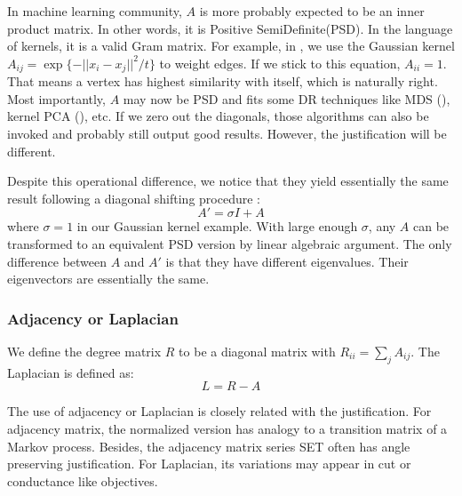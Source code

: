 In machine learning community, $A$ is more probably expected to be
an inner product matrix. In other words, it is Positive SemiDefinite(PSD). 
In the language of kernels, it is a valid Gram matrix. For example, 
in \rsec{\ref{sec:metric_hdd}}, we use the Gaussian kernel
$A_{ij} = \exp\{-||x_i-x_j||^2/t\}$ to weight edges. If we stick to 
this equation, $A_{ii} = 1$. That means a vertex has highest similarity 
with itself, which is naturally right. Most importantly, 
$A$ may now be PSD and fits some DR techniques like MDS
(\rsec{\ref{sec:mds}}), kernel PCA (\rsec{\ref{sec:kpca}}), etc. 
If we zero out the diagonals, those algorithms can also be invoked 
and probably still output good results. However, the justification 
will be different. 

Despite this operational difference, we notice that they yield 
essentially the same result following a diagonal shifting procedure
\cite{dhillon2004unified}:
\begin{equation}
	A' = \sigma I + A
\end{equation}
where $\sigma = 1$ in our Gaussian kernel example. 
With large enough $\sigma$, any $A$ can be transformed to 
an equivalent PSD version by linear algebraic argument. 
The only difference between $A$ and $A'$ is that they 
have different eigenvalues. Their eigenvectors are 
essentially the same. 

\subsubsection{Adjacency or Laplacian}
\label{sec:adj_lap}

We define the degree matrix $R$ to be a diagonal matrix with 
$R_{ii} = \sum_j{A_{ij}}$. The Laplacian is defined as:
\begin{equation}
	L = R - A
	\label{eq:def_lap}
\end{equation}

The use of adjacency or Laplacian is closely related with 
the justification. For adjacency matrix, the normalized version 
has analogy to a transition matrix of a Markov process. 
Besides, the adjacency matrix series SET often has 
angle preserving justification. 
For Laplacian, its variations may appear in cut or conductance
like objectives. 

